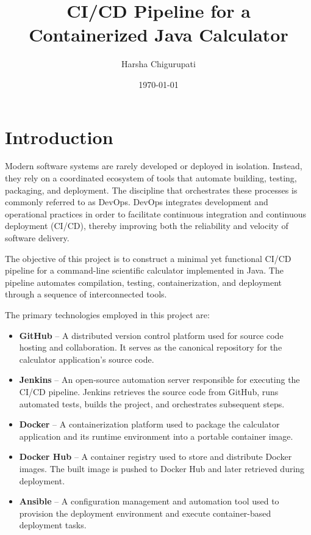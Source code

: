 \documentclass[12pt]{article}
\title{CI/CD Pipeline for a Containerized Java Calculator}
\author{Harsha Chigurupati}
\date{\today}
\begin{document}
\maketitle

\tableofcontents

\newpage
\section{Introduction}

Modern software systems are rarely developed or deployed in isolation. 
Instead, they rely on a coordinated ecosystem of tools that automate 
building, testing, packaging, and deployment. The discipline that 
orchestrates these processes is commonly referred to as DevOps. 
DevOps integrates development and operational practices in order to 
facilitate continuous integration and continuous deployment (CI/CD), 
thereby improving both the reliability and velocity of software delivery.

The objective of this project is to construct a minimal yet functional 
CI/CD pipeline for a command-line scientific calculator implemented in Java. 
The pipeline automates compilation, testing, containerization, and deployment 
through a sequence of interconnected tools.

The primary technologies employed in this project are:

\begin{itemize}
\item \textbf{GitHub} – A distributed version control platform used for 
source code hosting and collaboration. It serves as the canonical 
repository for the calculator application's source code.

\item \textbf{Jenkins} – An open-source automation server responsible for 
executing the CI/CD pipeline. Jenkins retrieves the source code from GitHub, 
runs automated tests, builds the project, and orchestrates subsequent steps.

\item \textbf{Docker} – A containerization platform used to package the 
calculator application and its runtime environment into a portable container image.

\item \textbf{Docker Hub} – A container registry used to store and distribute 
Docker images. The built image is pushed to Docker Hub and later retrieved 
during deployment.

\item \textbf{Ansible} – A configuration management and automation tool used 
to provision the deployment environment and execute container-based deployment tasks.
\end{itemize}
\end{document}
